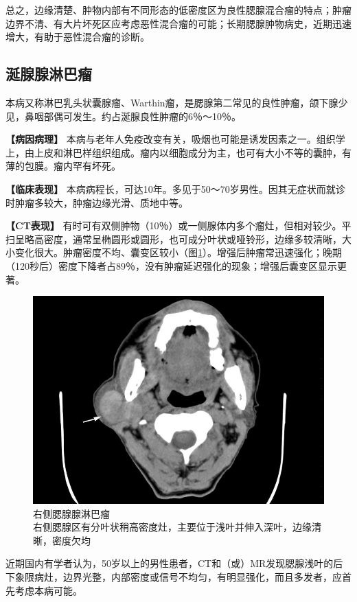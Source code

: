 总之，边缘清楚、肿物内部有不同形态的低密度区为良性腮腺混合瘤的特点；肿瘤边界不清、有大片坏死区应考虑恶性混合瘤的可能；长期腮腺肿物病史，近期迅速增大，有助于恶性混合瘤的诊断。

\subsection{涎腺腺淋巴瘤}

本病又称淋巴乳头状囊腺瘤、Warthin瘤，是腮腺第二常见的良性肿瘤，颌下腺少见，鼻咽部偶可发生。约占涎腺良性肿瘤的6％～10％。

\textbf{【病因病理】}
本病与老年人免疫改变有关，吸烟也可能是诱发因素之一。组织学上，由上皮和淋巴样组织组成。瘤内以细胞成分为主，也可有大小不等的囊肿，有薄的包膜。瘤内罕有坏死。

\textbf{【临床表现】}
本病病程长，可达10年。多见于50～70岁男性。因其无症状而就诊时肿瘤多较大，肿瘤边缘光滑、质地中等。

\textbf{【CT表现】}
有时可有双侧肿物（10％）或一侧腺体内多个瘤灶，但相对较少。平扫呈略高密度，通常呈椭圆形或圆形，也可成分叶状或哑铃形，边缘多较清晰，大小变化很大。肿瘤密度不均、囊变区较小（图\ref{fig7-6}）。增强后肿瘤常迅速强化；晚期（120秒后）密度下降者占89％，没有肿瘤延迟强化的现象；增强后囊变区显示更著。

\begin{figure}[!htbp]
 \centering
 \includegraphics[width=.7\textwidth,height=\textheight,keepaspectratio]{./images/Image00163.jpg}
 \captionsetup{justification=centering}
 \caption{右侧腮腺腺淋巴瘤\\{\small 右侧腮腺区有分叶状稍高密度灶，主要位于浅叶并伸入深叶，边缘清晰，密度欠均}}
 \label{fig7-6}
  \end{figure} 

近期国内有学者认为，50岁以上的男性患者，CT和（或）MR发现腮腺浅叶的后下象限病灶，边界光整，内部密度或信号不均匀，有明显强化，而且多发者，应首先考虑本病可能。

